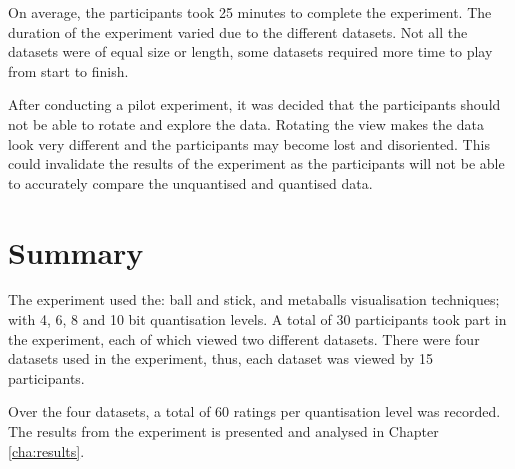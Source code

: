 On average, the participants took 25 minutes to complete the experiment. The
duration of the experiment varied due to the different datasets. Not all the
datasets were of equal size or length, some datasets required more time to play
from start to finish.

After conducting a pilot experiment, it was decided that the participants
should not be able to rotate and explore the data. Rotating the view makes the
data look very different and the participants may become lost and disoriented.
This could invalidate the results of the experiment as the participants will
not be able to accurately compare the unquantised and quantised data.


\section{Summary}
\label{sec:experiment_summary}

The experiment used the: ball and stick, and metaballs visualisation
techniques; with 4, 6, 8 and 10 bit quantisation levels. A total of 30
participants took part in the experiment, each of which viewed two different
datasets. There were four datasets used in the experiment, thus, each dataset
was viewed by 15 participants.

Over the four datasets, a total of 60 ratings per quantisation level was
recorded. The results from the experiment is presented and analysed in Chapter
\ref{cha:results}.



